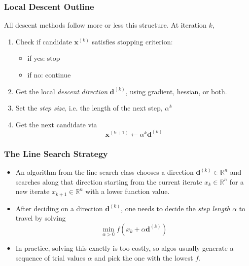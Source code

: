 \documentclass[11pt]{article}
\providecommand{\tightlist}{%
      \setlength{\itemsep}{0pt}\setlength{\parskip}{0pt}}
\begin{document}
    \subsubsection{Local Descent Outline}\label{local-descent-outline}

All descent methods follow more or less this structure. At iteration
\(k\),

\begin{enumerate}
\def\labelenumi{\arabic{enumi}.}
\tightlist
\item
  Check if candidate \(\mathbf{x}^{(k)}\) satisfies stopping criterion:

  \begin{itemize}
  \tightlist
  \item
    if yes: stop
  \item
    if no: continue
  \end{itemize}
\item
  Get the local \emph{descent direction} \(\mathbf{d}^{(k)}\), using
  gradient, hessian, or both.
\item
  Set the \emph{step size}, i.e. the length of the next step,
  \(\alpha^k\)
\item
  Get the next candidate via
  \[\mathbf{x}^{(k+1)} \longleftarrow \alpha^k\mathbf{d}^{(k)}\]
\end{enumerate}

    \subsubsection{The Line Search Strategy}\label{the-line-search-strategy}

\begin{itemize}
\tightlist
\item
  An algorithm from the line search class chooses a direction
  \(\mathbf{d}^{(k)} \in \mathbb{R}^n\) and searches along that
  direction starting from the current iterate \(x_k \in \mathbb{R}^n\)
  for a new iterate \(x_{k+1} \in \mathbb{R}^n\) with a lower function
  value.
\item
  After deciding on a direction \(\mathbf{d}^{(k)}\), one needs to
  decide the \emph{step length} \(\alpha\) to travel by solving
  \[ \min_{\alpha>0} f(x_k + \alpha \mathbf{d}^{(k)}) \]
\item
  In practice, solving this exactly is too costly, so algos usually
  generate a sequence of trial values \(\alpha\) and pick the one with
  the lowest \(f\).
\end{itemize}
\end{document}

